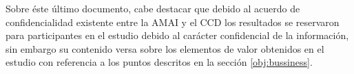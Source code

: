 Sobre éste último documento, cabe destacar que debido al acuerdo de confidencialidad existente entre la AMAI y el CCD los resultados se reservaron para participantes en el estudio debido al carácter confidencial de la información, sin embargo su contenido versa sobre los elementos de valor obtenidos en el estudio con referencia a los puntos descritos en la sección \ref{obj:bussiness}.
